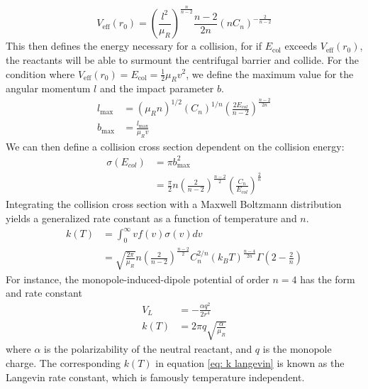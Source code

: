 \begin{equation}
    V_{\mathrm{eff}}(r_0) = \left(\frac{l^2}{\mu_R}\right)^{\frac{n}{n-2}} \frac{n-2}{2n}(n C_n)^{-\frac{2}{n-2}}
\end{equation}
This then defines the energy necessary for a collision, for if $E_{\mathrm{col}}$ exceeds $V_{\mathrm{eff}}(r_0)$, the reactants will be able to surmount the centrifugal barrier and collide. For the condition where $V_{\mathrm{eff}}(r_0) = E_{\mathrm{col}} = \frac{1}{2}\mu_R v^2$, we define the maximum value for the angular momentum $l$ and the impact parameter $b$.
\begin{align*}
    l_{\max} & = (\mu_R n)^{1/2}(C_n)^{1/n} \left(\frac{2 E_{col}}{n-2}\right)^{\frac{n-2}{2n}} \\
    b_{\max} & = \frac{l_{\max}}{\mu_R v}
\end{align*}
We can then define a collision cross section dependent on the collision energy:
\begin{align*}
    \sigma(E_{col}) & = \pi b^2_{\max} \\
    & = \frac{\pi}{2} n \left(\frac{2}{n-2}\right)^{\frac{n-2}{2}} \left(\frac{C_n}{E_{col}}\right)^{\frac{2}{n}}
\end{align*}
Integrating the collision cross section with a Maxwell Boltzmann distribution yields a generalized rate constant as a function of temperature and $n$.
\begin{align}
    k(T) & = \int_0^{\infty} v f(v) \sigma(v) dv \label{eq: k int} \\
    & = \sqrt{\frac{2 \pi}{\mu_R}}n\left(\frac{2}{n-2}\right)^{\frac{n-2}{2}}C_n^{2/n}(k_B T)^{\frac{n-4}{2n}}\Gamma\left(2-\frac{2}{n}\right) \label{eq: k(T)}
\end{align}
For instance, the monopole-induced-dipole potential of order $n=4$ has the form and rate constant
\begin{align}
	V_L & = -\frac{\alpha q^2}{2r^4} \label{eq: V_L} \\
	k(T) & = 2\pi q \sqrt{\frac{\alpha}{\mu_R}} \label{eq: k langevin}
\end{align}
where $\alpha$ is the polarizability of the neutral reactant, and $q$ is the monopole charge. The corresponding $k(T)$ in equation \ref{eq: k langevin} is known as the Langevin rate constant, which is famously temperature independent.
